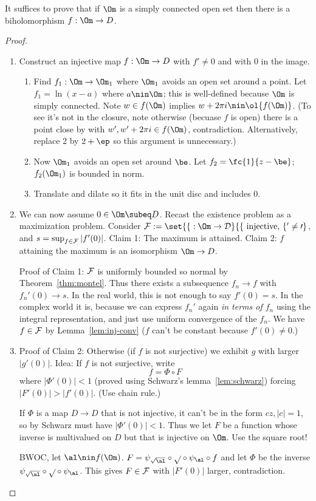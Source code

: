 It suffices to prove that if $\Om$ is a simply connected open set then there is a biholomorphism $f:\Om \to D$.

\begin{proof}
\begin{enumerate}
\item
Construct an injective map $f:\Om \to D$ with $f'\ne 0$ and with 0 in the image.
\begin{enumerate}
\item
Find $f_1:\Om\to \Om_1$ where $\Om_1$ avoids an open set around a point. 
Let $f_1=\ln (x-a)$ where $a\nin \Om$; this is well-defined because $\Om$ is simply connected. 
Note $w\in f(\Om)$ implies $w+ 2\pi i\nin \ol{f(\Om)}$. (To see it's not in the closure, note otherwise (becuase $f$ is open) there is a point close by with $w',w'+2\pi i\in f(\Om)$, contradiction. Alternatively, replace 2 by $2+\ep$ so this argument is unnecessary.)
\item
Now $\Om_1$ avoids an open set around $\be$. Let $f_2=\fc{1}{z-\be}$; $f_2(\Om_1)$ is bounded in norm.
\item
Translate and dilate so it fits in the unit disc and includes 0.
\end{enumerate}
\item 
We can now assume $0\in \Om\subeq D$. 
Recast the existence problem as a maximization problem. Consider $\cal F:=\set{f:\Om \to D}{f\text{ injective, }f'\ne 0}$, and $s=\sup_{f\in \cal F}|f'(0)|$. Claim 1: The maximum is attained. Claim 2: $f$ attaining the maximum is an isomorphism $\Om \to D$.

Proof of Claim 1: $\cal F$ is uniformly bounded so normal by Theorem~\ref{thm:montel}. Thus there exists a subsequence $f_n\to f$ with $f_n'(0)\to s$. In the real world, this is not enough to say $f'(0)=s$. In the complex world it is, because we can express $f_n'$ again {\it in terms of $f_n$} using the integral representation, and just use uniform convergence of the $f_n$. We have $f\in \cal F$ by Lemma~\ref{lem:inj-conv} ($f$ can't be constant because $f'(0)\ne 0$.)
\item
Proof of Claim 2: Otherwise (if $f$ is not surjective) we exhibit $g$ with larger $|g'(0)|$. Idea: If $f$ is not surjective, write
\[
f=\Phi\circ F
\]
where $|\Phi'(0)|<1$ (proved using Schwarz's lemma~\ref{lem:schwarz}) forcing $|F'(0)|>|f'(0)|$. (Use chain rule.)

If $\Phi$ is a map $D\to D$ that is not injective, it can't be in the form $cz,|c|=1$, so by Schwarz must have $|\Phi'(0)|<1$. Thus we let $F$ be a function whose inverse is multivalued on $D$ but that is injective on $\Om$. Use the square root!

BWOC, let $\al\nin f(\Om)$. $F=\psi_{\sqrt{\al}}\circ \sqrt{}\circ \psi_\al\circ f$ and let $\Phi$ be the inverse $\psi_{\sqrt{\al}}\circ \sqrt{}\circ \psi_\al$. This gives $F\in \cal F$ with $|F'(0)|$ larger, contradiction.
\end{enumerate}
\end{proof}

